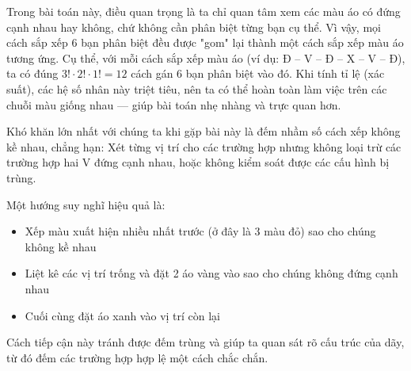 \documentclass[12pt, a4paper]{article}
\begin{document}
	
	\vspace{0.2cm}
	
	\noindent{}
	
	\vspace{0.3cm}
	
	
	\noindent Trong bài toán này, điều quan trọng là ta chỉ quan tâm xem các màu áo có đứng cạnh nhau hay không, chứ không cần phân biệt từng bạn cụ thể. Vì vậy, mọi cách sắp xếp 6 bạn phân biệt đều được "gom" lại thành một cách sắp xếp màu áo tương ứng. Cụ thể, với mỗi cách sắp xếp màu áo (ví dụ: Đ -- V -- Đ -- X -- V -- Đ), ta có đúng $3! \cdot 2! \cdot 1! = 12$ cách gán 6 bạn phân biệt vào đó. Khi tính tỉ lệ (xác suất), các hệ số nhân này triệt tiêu, nên ta có thể hoàn toàn làm việc trên các chuỗi màu giống nhau --- giúp bài toán nhẹ nhàng và trực quan hơn.
	
	\noindent Khó khăn lớn nhất với chúng ta khi gặp bài này là đếm nhầm số cách xếp không kề nhau, chẳng hạn: Xét từng vị trí cho các trường hợp nhưng không loại trừ các trường hợp hai V đứng cạnh nhau, hoặc không kiểm soát được các cấu hình bị trùng.
	
	\noindent Một hướng suy nghĩ hiệu quả là:
	\begin{itemize}[leftmargin=*]
		\item Xếp màu xuất hiện nhiều nhất trước (ở đây là 3 màu đỏ) sao cho chúng không kề nhau
		\item Liệt kê các vị trí trống và đặt 2 áo vàng vào sao cho chúng không đứng cạnh nhau
		\item Cuối cùng đặt áo xanh vào vị trí còn lại
	\end{itemize}
	\noindent Cách tiếp cận này tránh được đếm trùng và giúp ta quan sát rõ cấu trúc của dãy, từ đó đếm các trường hợp hợp lệ một cách chắc chắn.
	
	\vspace{0.3cm}
	
	
	\vspace{0.2cm}
	
\end{document}
